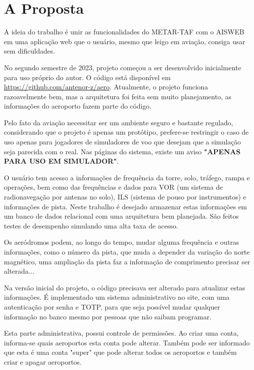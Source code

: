 \chapter{A Proposta}
A ideia do trabalho é unir as funcionalidades do METAR-TAF com o AISWEB em uma 
aplicação web que o usuário, mesmo que leigo em aviação, consiga usar sem 
dificuldades.

No segundo semestre de 2023, projeto começou a ser desenvolvido inicialmente para uso próprio do autor.
O código está disponível em \url{https://github.com/antenor-z/aero}. Atualmente, o
projeto funciona razoavelmente bem, mas a arquitetura foi feita sem muito planejamento, as
informações do aeroporto fazem parte do código.

Pelo fato da aviação necessitar ser um ambiente seguro e bastante regulado, considerando
que o projeto é apenas um protótipo, prefere-se restringir o caso de uso apenas
para jogadores de simuladores de voo que desejam que a simulação seja parecida
com o real. Nas páginas do sistema, existe um aviso \textbf{"APENAS PARA USO EM SIMULADOR"}.

O usuário tem acesso a informações de frequência da torre, solo, tráfego, rampa
e operações, bem como das frequências e dados para VOR (um sistema de radionavegação
por antenas no solo), ILS (sistema de pouso por instrumentos) e informações de 
pista. Neste trabalho é desejado armazenar estas informações em um banco de dados relacional com 
uma arquitetura bem planejada. São feitos testes de desempenho simulando uma alta taxa 
de acesso.

Os aeródromos podem, ao longo do tempo, mudar alguma frequência e outras
informações, como o número da pista, que muda a depender da variação do norte 
magnético, uma ampliação da pista faz a informação de comprimento precisar ser 
alterada...

Na versão inicial do projeto, o código precisava ser alterado para atualizar estas informações. É implementado
 um sistema administrativo no site, com uma autenticação por senha e TOTP, para 
 que seja possível mudar qualquer informação no banco mesmo por pessoas que não 
 saibam programar.

Esta parte administrativa, possui controle de permissões. Ao criar uma conta, 
informa-se quais aeroportos esta conta pode alterar. Também pode ser informado que
  esta é uma conta "super" que pode alterar todos os aeroportos e também criar e 
  apagar aeroportos.

